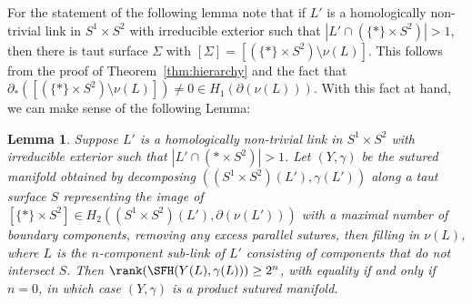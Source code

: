 \documentclass{amsart}
\newtheorem{lemma}[theorem]{Lemma}
\theoremstyle{definition}
\theoremstyle{remark}
\numberwithin{equation}{section}
\begin{document}
For the statement of the following lemma note that if $L'$ is a homologically non-trivial link in $S^1\times S^2$ with irreducible exterior such that $|L'\cap (\{*\}\times S^2)|>1$, then there is taut surface $\Sigma$ with $[\Sigma]=[(\{*\}\times S^2)\setminus\nu(L)]$. This follows from the proof of Theorem~\ref{thm:hierarchy} and the fact that $\partial_*([(\{*\}\times S^2)\setminus\nu(L)])\neq 0\in H_1(\partial(\nu(L)))$. With this fact at hand, we can make sense of the following Lemma:


\begin{lemma}\label{lem:spherebraidlemma}
    Suppose $L'$ is a homologically non-trivial link in $S^1\times S^2$ with irreducible exterior such that $|L'\cap (*\times S^2)|>1$. Let $(Y,\gamma)$ be the sutured manifold obtained by decomposing $((S^1\times S^2)(L'),\gamma(L'))$ along a taut surface $S$ representing the image of $[\{*\}\times S^2]\in H_2((S^1\times S^2)(L'),\partial(\nu(L')))$ with a maximal number of boundary components, removing any excess parallel sutures, then filling in $\nu(L)$, where $L$ is the $n$-component sub-link of $L'$ consisting of components that do not intersect $S$. Then ${\rank(\SFH(Y(L),\gamma(L)))\geq 2^n}$, with equality if and only if $n=0$, in which case $(Y,\gamma)$ is a product sutured manifold.
\end{lemma}
\end{document}
